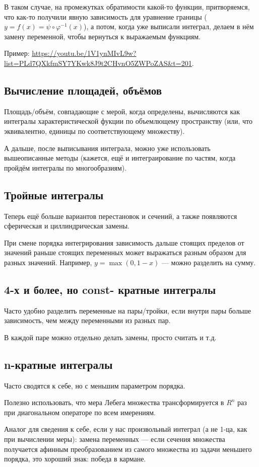 \documentclass[12pt, a4paper]{article}
\begin{document}
В таком случае, на промежутках обратимости какой-то функции, притворяемся,
что как-то получили явную зависимость для уравнение границы ($y = f(x) = \psi \circ \varphi^{-1}(x)$),
а потом, когда уже выписали интеграл, делаем в нём замену переменной, чтобы вернуться к выражаемым функциям.

Пример: \url{https://youtu.be/1V1ynMIvL9w?list=PLd7QXkfmSY7YKwk8J9t2CHvnO5ZWPoZAS&t=201}.



\subsection{Вычисление площадей, объёмов}

Площадь/объём, совпадающие с мерой, когда определены,
вычисляются как интегралы характеристической фукции по объемлющему пространству
(или, что эквивалентно, единицы по соответствующему множеству).

А дальше, после выписывания интеграла, можно уже использовать вышеописанные методы (кажется, ещё и интеграирование по частям, когда пройдём интегралы по многообразиям).


\subsection{Тройные интегралы}

Теперь ещё больше вариантов перестановок и сечений,
а также появляются сферическая и циллиндрическая замены. 

При смене порядка интегрирования зависимость дальше стоящих пределов от значений раньше стоящих переменных может выражаться разным образом для разных значений.
Например, $y = \max(0, 1 - x)$ — можно разделить на сумму.


\subsection{4-х и более, но const- кратные интегралы}

Часто удобно разделить переменные на пары/тройки, если внутри пары больше зависимость, чем между переменными из разных пар.

В каждой паре можно отдельно делать замены, просто считать и т.д.


\subsection{n-кратные интегралы}

Часто сводятся к себе, но с меньшим параметром порядка.

Полезно использовать, что мера Лебега множества трансформируется в $R^n$ раз при диагональном операторе по всем имерениям.

Аналог для сведения к себе, если у нас произвольный интеграл (а не 1-ца, как при вычислении меры): замена переменных — если сечения множества получается афинным преобразованием
из самого множества из задачи меньшего порядка, это хороший знак: победа в кармане.
\end{document}
